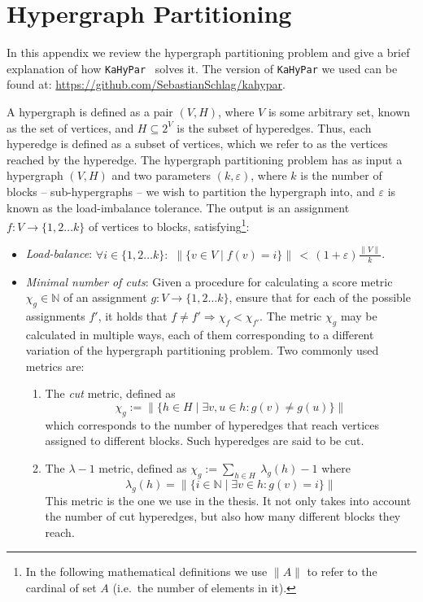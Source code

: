 \chapter{Hypergraph Partitioning}
\label{chap:HypPart}

In this appendix we review the hypergraph partitioning problem and give a brief explanation of how \texttt{KaHyPar}~\citep{KaHyPar} solves it. The version of \texttt{KaHyPar} we used can be found at: \url{https://github.com/SebastianSchlag/kahypar}.

A hypergraph is defined as a pair \((V,H)\), where \(V\) is some arbitrary set, known as the set of vertices, and \(H \subseteq 2^V\) is the subset of hyperedges. Thus, each hyperedge is defined as a subset of vertices, which we refer to as the vertices reached by the hyperedge. The hypergraph partitioning problem has as input a hypergraph \((V,H)\) and two parameters \((k,\varepsilon)\), where \(k\) is the number of blocks -- sub-hypergraphs -- we wish to partition the hypergraph into, and \(\varepsilon\) is known as the load-imbalance tolerance. The output is an assignment \(f\colon V \to \{1,2 \dots k\}\) of vertices to blocks, satisfying\footnote{In the following mathematical definitions we use \(\lVert A \rVert\) to refer to the cardinal of set \(A\) (i.e.\ the number of elements in it).}:

\begin{itemize}
  \item \textit{Load-balance}: \(\forall i \in \{1,2 \dots k\}\colon \,\, \lVert \{v \in V \mid f(v) = i\} \rVert \, < \, (1+\varepsilon)\frac{\lVert V \rVert}{k} \).
  \item \textit{Minimal number of cuts}: Given a procedure for calculating a score metric \(\chi_g \in \mathbb{N}\) of an assignment \(g\colon V \to \{1,2 \dots k\}\), ensure that for each of the possible assignments \(f'\), it holds that \(f \not = f' \Rightarrow  \chi_f < \chi_{f'}\). The metric \(\chi_g\) may be calculated in multiple ways, each of them corresponding to a different variation of the hypergraph partitioning problem. Two commonly used metrics are:
    \begin{enumerate} 
      \renewcommand{\theenumi}{\alph{enumi})}
      \item The \textit{cut} metric, defined as \[\chi_g := \lVert \{h \in H \mid \exists v,u \in h\colon g(v) \not = g(u) \} \rVert\] which corresponds to the number of hyperedges that reach vertices assigned to different blocks. Such hyperedges are said to be cut. 
      \item The \(\lambda\!-\!1\) metric, defined as \(\chi_g := \sum_{h \in H} \ \lambda_g(h)\!-\! 1\) where \[\lambda_g(h) = \lVert \{i \in \mathbb{N} \mid \exists v \in h\colon g(v)=i \} \rVert\] This metric is the one we use in the thesis. It not only takes into account the number of cut hyperedges, but also how many different blocks they reach.
    \end{enumerate}
\end{itemize}

